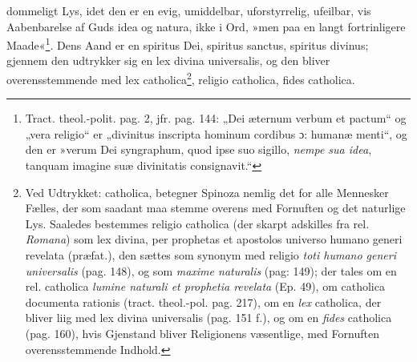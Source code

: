 \documentclass[12pt,a4paper]{book}
\begin{document}
dommeligt Lys, idet den er en evig, umiddelbar, uforstyrrelig, ufeilbar, vis Aabenbarelse af Guds idea og natura, ikke i Ord, »men paa en langt fortrinligere Maade«\footnote{%
Tract. theol.-polit. pag. 2, jfr. pag. 144: „Dei æternum verbum et pactum“ og „vera religio“ er „divinitus inscripta hominum cordibus ɔ: humanæ menti“, og den er »verum Dei syngraphum, quod ipse suo sigillo, \emph{nempe sua idea}, tanquam imagine suæ divinitatis consignavit.“}. Dens Aand er en spiritus Dei, spiritus sanctus, spiritus divinus; gjennem den udtrykker sig en lex divina universalis, og den bliver overensstemmende med lex catholica\footnote{Ved Udtrykket: catholica, betegner Spinoza nemlig det for alle Mennesker Fælles, der som saadant maa stemme overens med Fornuften og det naturlige Lys. Saaledes bestemmes religio catholica (der skarpt adskilles fra rel. \emph{Romana}) som lex divina, per prophetas et apostolos universo humano generi revelata (præfat.), den sættes som synonym med religio \emph{toti humano generi universalis} (pag. 148), og som \emph{maxime naturalis} (pag: 149); der tales om en rel. catholica \emph{lumine naturali et prophetia revelata} (Ep. 49), om catholica documenta rationis (tract. theol.-pol. pag. 217), om en \emph{lex} catholica, der bliver liig med lex divina universalis (pag. 151 f.), og om en \emph{fides} catholica (pag. 160), hvis Gjenstand bliver Religionens væsentlige, med
Fornuften overensstemmende Indhold.}, religio catholica, fides catholica.
\end{document}
